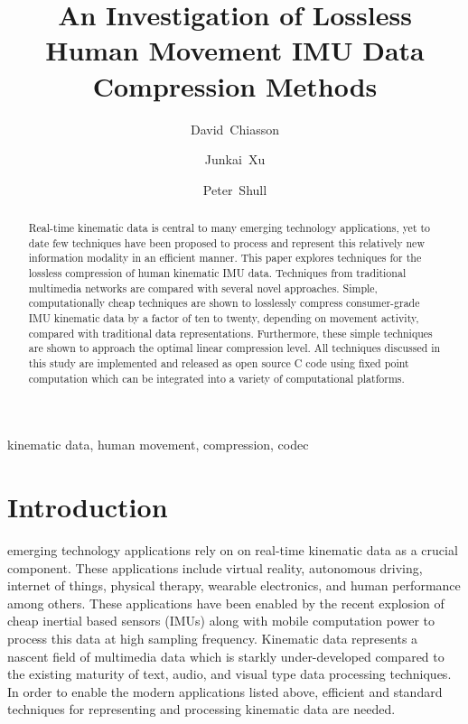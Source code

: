 \documentclass[journal]{IEEEtran}
\begin{document}
\title{An Investigation of Lossless Human Movement IMU Data Compression Methods}

\author[1]{David~Chiasson}
\author[1]{Junkai~Xu}
\author[1]{Peter~Shull}

\maketitle

\begin{abstract}
Real-time kinematic data is central to many emerging technology applications, yet to date few techniques have been proposed to process and represent this relatively new information modality in an efficient manner. This paper explores techniques for the lossless compression of human kinematic IMU data. Techniques from traditional multimedia networks are compared with several novel approaches. Simple, computationally cheap techniques are shown to losslessly compress consumer-grade IMU kinematic data by a factor of ten to twenty, depending on movement activity, compared with traditional data representations. Furthermore, these simple techniques are shown to approach the optimal linear compression level. All techniques discussed in this study are implemented and released as open source C code using fixed point computation which can be integrated into a variety of computational platforms. 
\end{abstract}

\begin{IEEEkeywords}
kinematic data, human movement, compression, codec
\end{IEEEkeywords}



\section{Introduction}

 emerging technology applications rely on on real-time kinematic data as a crucial component. These applications include virtual reality, autonomous driving, internet of things, physical therapy, wearable electronics, and human performance among others. These applications have been enabled by the recent explosion of cheap inertial based sensors (IMUs) along with mobile computation power to process this data at high sampling frequency. Kinematic data represents a nascent field of multimedia data which is starkly under-developed compared to the existing maturity of text, audio, and visual type data processing techniques. In order to enable the modern applications listed above, efficient and standard techniques for representing and processing kinematic data are needed.
\end{document}
